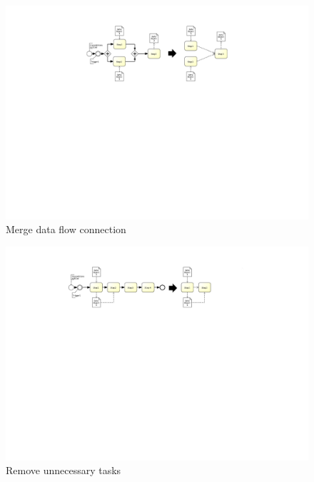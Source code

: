 \begin{figure}[h!]
	\includegraphics[width=14cm, trim={8.5cm 13.5cm 8.5cm 2.0cm}]{img/ExtractDFDGateWayMerge.pdf}
	\caption{Merge data flow connection}
	\label{fig:mergeDataFlow}
\end{figure}

\begin{figure}[h!]
	\includegraphics[width=\textwidth, trim={7.5cm 15.3cm 8.5cm 1.5cm}]{img/ExtractDFDRemove.pdf}
	\caption{Remove unnecessary tasks}
	\label{fig:removeDataFlow}
\end{figure}



\pagebreak
\newpage


